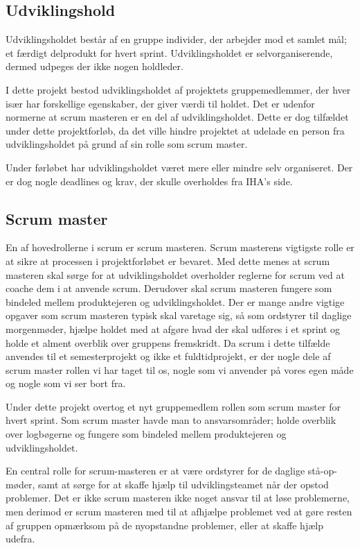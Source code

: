 \subsection{Udviklingshold}
Udviklingsholdet består af en gruppe individer, der arbejder mod et samlet mål; et færdigt delprodukt for hvert sprint. Udviklingsholdet er selvorganiserende, dermed udpeges der ikke nogen holdleder. \newline

I dette projekt bestod udviklingsholdet af projektets gruppemedlemmer, der hver især har forskellige egenskaber, der giver værdi til holdet. Det er udenfor normerne at scrum masteren er en del af udviklingsholdet. Dette er dog tilfældet under dette projektforløb, da det ville hindre projektet at udelade en person fra udviklingsholdet på grund af sin rolle som scrum master. \par
Under førløbet har udviklingsholdet været mere eller mindre selv organiseret. Der er dog nogle deadlines og krav, der skulle overholdes fra IHA's side.


\subsection{Scrum master}
En af hovedrollerne i scrum er scrum masteren. Scrum masterens vigtigste rolle er at sikre at processen i projektforløbet er bevaret. Med dette menes at scrum masteren skal sørge for at udviklingsholdet overholder reglerne for scrum ved at coache dem i at anvende scrum. Derudover skal scrum masteren fungere som bindeled mellem produktejeren og udviklingsholdet. Der er mange andre vigtige opgaver som scrum masteren typisk skal varetage sig, så som ordstyrer til daglige morgenmøder, hjælpe holdet med at afgøre hvad der skal udføres i et sprint og holde et alment overblik over gruppens fremskridt. Da scrum i dette tilfælde anvendes til et semesterprojekt og ikke et fuldtidprojekt, er der nogle dele af scrum master rollen vi har taget til os, nogle som vi anvender på vores egen måde og nogle som vi ser bort fra. \newline

Under dette projekt overtog et nyt gruppemedlem rollen som scrum master for hvert sprint. Som scrum master havde man to ansvarsområder; holde overblik over logbøgerne og fungere som bindeled mellem produktejeren og udviklingsholdet. \newline

En central rolle for scrum-masteren er at være ordstyrer for de daglige stå-op-møder, samt at sørge for at skaffe hjælp til udviklingsteamet når der opstod problemer. Det er ikke scrum masteren ikke noget ansvar til at løse problemerne, men derimod er scrum masteren med til at afhjælpe problemet ved at gøre resten af gruppen opmærksom på de nyopstandne problemer, eller at skaffe hjælp udefra. 

